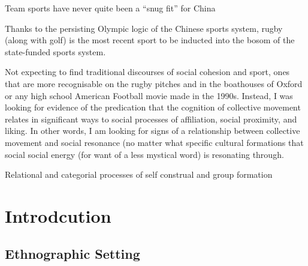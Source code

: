 \documentclass[12pt]{report}
\begin{document}
        Team sports have never quite been a ``snug fit'' for China

        Thanks to the persisting Olympic logic of the Chinese sports system, rugby (along with golf) is the most recent sport to be inducted into the bosom of the state-funded sports system.

        Not expecting to find traditional discourses of social cohesion and sport, ones that are more recognisable on the rugby pitches and in the boathouses of Oxford or any high school American Football movie made in the 1990s.  Instead, I was looking for evidence of the predication that the cognition of collective movement relates in significant ways to social processes of affiliation, social proximity, and liking.  In other words, I am looking for signs of a relationship between collective movement and social resonance (no matter what specific cultural  formations that social social energy (for want of a less mystical word) is resonating through.

        Relational and categorial processes of self construal and group formation










\section{Introdcution}




\subsection{Ethnographic Setting}
\end{document}
